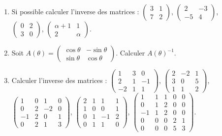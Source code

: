 \documentclass[class=report,crop=false]{standalone}
\begin{document}
\begin{miniexercices}
\sauteligne
\begin{enumerate}
  \item Si possible calculer l'inverse des matrices :
  $\left(\begin{smallmatrix}3&1\\7&2\end{smallmatrix}\right)$,
  $\left(\begin{smallmatrix}2&-3\\-5&4\end{smallmatrix}\right)$,
  $\left(\begin{smallmatrix}0&2\\3&0\end{smallmatrix}\right)$,
  $\left(\begin{smallmatrix}\alpha+1&1\\2&\alpha\end{smallmatrix}\right)$.

  \item Soit
  $A(\theta)=\left(\begin{smallmatrix} \cos \theta & -\sin\theta \\ \sin\theta & \cos\theta\end{smallmatrix}\right)$.
  Calculer $A(\theta)^{-1}$.

  \item Calculer l'inverse des matrices :
  $\left(\begin{smallmatrix}1&3&0\\2&1&-1\\-2&1&1\end{smallmatrix}\right)$,
  $\left(\begin{smallmatrix}2&-2&1\\3&0&5\\1&1&2\end{smallmatrix}\right)$,
  $\left(\begin{smallmatrix}1&0&1&0\\0&2&-2&0\\-1&2&0&1\\0&2&1&3\end{smallmatrix}\right)$,
  $\left(\begin{smallmatrix}2&1&1&1\\1&0&0&1\\0&1&-1&2\\0&1&1&0\end{smallmatrix}\right)$,
  $\left(\begin{smallmatrix}1&1&1&0&0\\0&1&2&0&0\\-1&1&2&0&0\\0&0&0&2&1\\0&0&0&5&3\end{smallmatrix}\right)$.

\end{enumerate}
\end{miniexercices}
\end{document}

